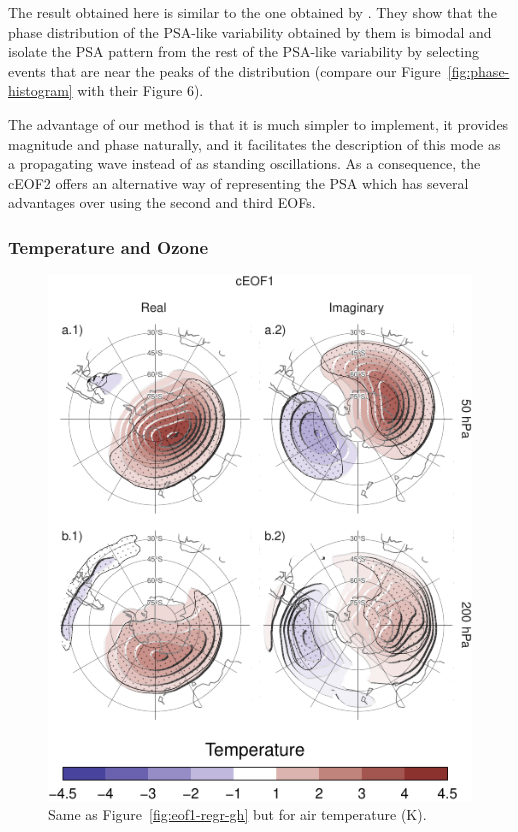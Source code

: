 \documentclass[smallextended]{svjour3}       %
\begin{document}
The result obtained here is similar to the one obtained by \citet{irving2016}.
They show that the phase distribution of the PSA-like variability obtained by them is bimodal and isolate the PSA pattern from the rest of the PSA-like variability by selecting events that are near the peaks of the distribution (compare our Figure~\ref{fig:phase-histogram} with their Figure 6).

The advantage of our method is that it is much simpler to implement, it provides magnitude and phase naturally, and it facilitates the description of this mode as a propagating wave instead of as standing oscillations.
As a consequence, the cEOF2 offers an alternative way of representing the PSA which has several advantages over using the second and third EOFs.

\hypertarget{temperature-and-ozone}{%
\subsubsection{Temperature and Ozone}\label{temperature-and-ozone}}



\begin{figure}
\centering
\includegraphics{../figures/eof1-regr-t-1.pdf}
\caption{\label{fig:eof1-regr-t}Same as Figure~\ref{fig:eof1-regr-gh} but for air temperature (K).}
\end{figure}
\end{document}
